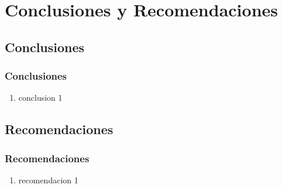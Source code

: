 \section{Conclusiones y Recomendaciones}
\subsection{Conclusiones}
\begin{justify}


\begin{frame}
\frametitle{Conclusiones}
   \begin{enumerate}
   \item conclusion 1
   \end{enumerate}
\end{frame}

\subsection{Recomendaciones}


\begin{frame}
   \frametitle{Recomendaciones}
   \begin{enumerate}
      \item recomendacion 1
   \end{enumerate}
\end{frame}

\end{justify}

